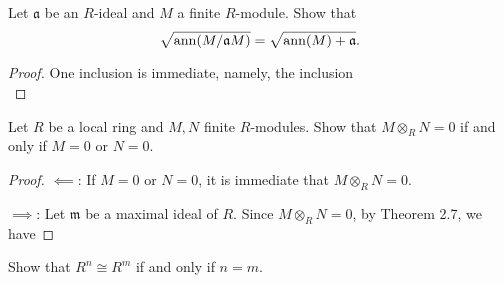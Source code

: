 \begin{problem}
Let $\mathfrak{a}$ be an $R$-ideal and $M$ a finite
$R$-module. Show that
\[
\sqrt{\operatorname{ann}(M/\mathfrak{a}M)}=\sqrt{\operatorname{ann}(M)+\mathfrak{a}}.
\]
\end{problem}
\begin{proof}
One inclusion is immediate, namely, the inclusion
\[

\]

\end{proof}
\newpage
\begin{problem}
Let $R$ be a local ring and $M,N$ finite $R$-modules. Show that
$M\otimes_R N=0$ if and only if $M=0$ or $N=0$.
\end{problem}
\begin{proof}
$\impliedby$: If $M=0$ or $N=0$, it is immediate that $M\otimes_R
N=0$.

$\implies$: Let $\mathfrak{m}$ be a maximal ideal of $R$. Since
$M\otimes_R N=0$, by Theorem 2.7, we have

\end{proof}
\newpage
\begin{problem}
Show that $R^n\cong R^m$ if and only if $n=m$.
\end{problem}
